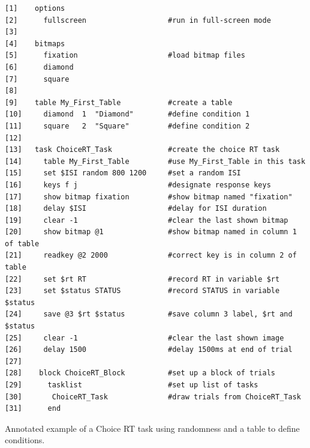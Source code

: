 \begin{tcolorbox}[every float=\centering, drop shadow,     title=The Choice RT Experiment Script]
\begin{Verbatim}
[1]    options
[2]      fullscreen                   #run in full-screen mode
[3]
[4]    bitmaps
[5]      fixation                     #load bitmap files
[6]      diamond
[7]      square
[8]
[9]    table My_First_Table           #create a table
[10]     diamond  1  "Diamond"        #define condition 1
[11]     square   2  "Square"         #define condition 2
[12]   
[13]   task ChoiceRT_Task             #create the choice RT task
[14]     table My_First_Table         #use My_First_Table in this task
[15]     set $ISI random 800 1200     #set a random ISI
[16]     keys f j                     #designate response keys
[17]     show bitmap fixation         #show bitmap named "fixation"
[18]     delay $ISI                   #delay for ISI duration
[19]     clear -1                     #clear the last shown bitmap
[20]     show bitmap @1               #show bitmap named in column 1 of table
[21]     readkey @2 2000              #correct key is in column 2 of table
[22]     set $rt RT                   #record RT in variable $rt
[23]     set $status STATUS           #record STATUS in variable $status
[24]     save @3 $rt $status          #save column 3 label, $rt and $status
[25]     clear -1                     #clear the last shown image
[26]     delay 1500                   #delay 1500ms at end of trial
[27]
[28]    block ChoiceRT_Block          #set up a block of trials
[29]      tasklist                    #set up list of tasks            
[30]       ChoiceRT_Task              #draw trials from ChoiceRT_Task
[31]      end
    \end{Verbatim}
\tcblower
\begin{codeblock}{Annotated example of a Choice RT task using randomness and a table to define conditions.}\label{code:choiceRT}\end{codeblock}
\end{tcolorbox}

